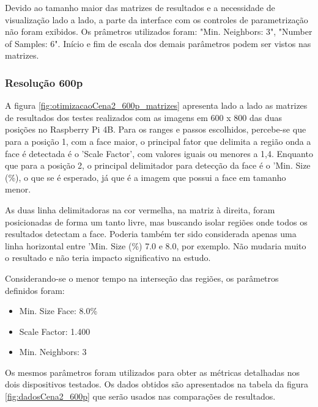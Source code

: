 Devido ao tamanho maior das matrizes de resultados e a necessidade de visualização lado a lado, a parte da interface com os controles de parametrização não foram exibidos. Os prâmetros utilizados foram: "Min. Neighbors: 3", "Number of Samples: 6". Início e fim de escala dos demais parâmetros podem ser vistos nas matrizes.

\subsubsection{Resolução 600p} \label{sssec:resolution2-1}

A figura \ref{fig:otimizacaoCena2_600p_matrizes} apresenta lado a lado as matrizes de resultados dos testes realizados com as imagens em 600 x 800 das duas posições no Raspberry Pi 4B. Para os ranges e passos escolhidos, percebe-se que para a posição 1, com a face maior, o principal fator que delimita a região onda a face é detectada é o 'Scale Factor', com valores iguais ou menores a 1,4. Enquanto que para a posição 2, o principal delimitador para detecção da face é o 'Min. Size (\%), o que se é esperado, já que é a imagem que possui a face em tamanho menor.

As duas linha delimitadoras na cor vermelha, na matriz à direita, foram posicionadas de forma um tanto livre, mas buscando isolar regiões onde todos os resultados detectam a face. Poderia também ter sido considerada apenas uma linha horizontal entre 'Min. Size (\%) 7.0 e 8.0, por exemplo. Não mudaria muito o resultado e não teria impacto significativo na estudo.

Considerando-se o menor tempo na interseção das regiões, os parâmetros definidos foram:
\begin{itemize}
    \SingleSpacing
    \item Min. Size Face: 8.0\%
    \item Scale Factor: 1.400
    \item Min. Neighbors: 3
\end{itemize}

Os mesmos parâmetros foram utilizados para obter as métricas detalhadas nos dois dispositivos testados. Os dados obtidos são apresentados na tabela da figura \ref{fig:dadosCena2_600p} que serão usados nas comparações de resultados.

